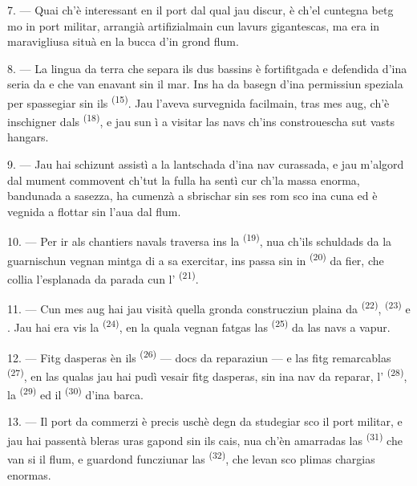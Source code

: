 \VUsaut{3.0mm}
\VUsaut{3.0mm}

7. --- Quai ch'è interessant en il port dal qual jau discur, è ch'el cuntegna betg mo
in port militar, arrangià artifizialmain cun lavurs gigantescas, ma era in
maravigliusa  situà en la bucca d'in grond flum.

8. --- La lingua da terra che separa ils dus bassins è fortifitgada e defendida
d'ina seria da  e  che van enavant sin il mar. Ins ha
da basegn d'ina permissiun speziala per spassegiar sin ils 
\textsuperscript{(15)}. Jau l'aveva survegnida facilmain, tras mes aug, ch'è inschigner
dals  \textsuperscript{(18)}, e jau sun ì a visitar las navs ch'ins
constrouescha sut vasts hangars.

9. --- Jau hai schizunt assistì a la lantschada d'ina nav curassada, e jau
m'algord dal mument commovent ch'tut la fulla ha sentì cur ch'la massa enorma,
bandunada a sasezza, ha cumenzà a sbrischar sin ses rom sco ina cuna ed è vegnida a
flottar sin l'aua dal flum.

10. --- Per ir als chantiers navals traversa ins la 
\textsuperscript{(19)}, nua ch'ils schuldads da la guarnischun vegnan mintga di a sa
exercitar, ins passa sin in  \textsuperscript{(20)} da fier, che collia
l'esplanada da parada cun l' \textsuperscript{(21)}.

\VUsaut{3.0mm}
\VUsaut{3.0mm}

11. --- Cun mes aug hai jau visità quella gronda construcziun plaina da
 \textsuperscript{(22)},  \textsuperscript{(23)} e .
Jau hai era vis la  \textsuperscript{(24)}, en la quala vegnan
fatgas las  \textsuperscript{(25)} da las navs a vapur.

12. --- Fitg dasperas èn ils  \textsuperscript{(26)} --- docs da reparaziun ---
e las fitg remarcablas  \textsuperscript{(27)}, en las qualas jau hai
pudì vesair fitg dasperas, sin ina nav da reparar, l'
\textsuperscript{(28)}, la  \textsuperscript{(29)} ed il 
\textsuperscript{(30)} d'ina barca.

13. --- Il port da commerzi è precis uschè degn da studegiar sco il port militar, e
jau hai passentà bleras uras gapond sin ils cais, nua ch'èn amarradas las  \textsuperscript{(31)} che van si il flum, e guardond funcziunar las  \textsuperscript{(32)}, che levan sco plimas chargias enormas.

